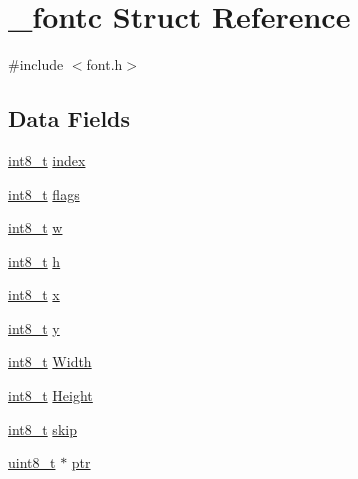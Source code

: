 \hypertarget{struct__fontc}{\section{\-\_\-fontc Struct Reference}
\label{struct__fontc}
}


{\ttfamily \#include $<$font.\-h$>$}

\subsection*{Data Fields}
\begin{DoxyCompactItemize}
\item 
\hyperlink{earth2wireframe_8c_aef44329758059c91c76d334e8fc09700}{int8\-\_\-t} \hyperlink{struct__fontc_a7cc0370744ff7ea964054d36917c9a2f}{index}
\item 
\hyperlink{earth2wireframe_8c_aef44329758059c91c76d334e8fc09700}{int8\-\_\-t} \hyperlink{struct__fontc_aa74d9a5513b529b5e444f283afea40ef}{flags}
\item 
\hyperlink{earth2wireframe_8c_aef44329758059c91c76d334e8fc09700}{int8\-\_\-t} \hyperlink{struct__fontc_a9c2af0354d2b2009e7b6684e25fd479b}{w}
\item 
\hyperlink{earth2wireframe_8c_aef44329758059c91c76d334e8fc09700}{int8\-\_\-t} \hyperlink{struct__fontc_a9feb8c838dfc1d4eebb15c8e53981944}{h}
\item 
\hyperlink{earth2wireframe_8c_aef44329758059c91c76d334e8fc09700}{int8\-\_\-t} \hyperlink{struct__fontc_ad15d00ed46ebe52a085cf05b5ca5da90}{x}
\item 
\hyperlink{earth2wireframe_8c_aef44329758059c91c76d334e8fc09700}{int8\-\_\-t} \hyperlink{struct__fontc_aebbde0dc41068722ee1a69f4a56478a4}{y}
\item 
\hyperlink{earth2wireframe_8c_aef44329758059c91c76d334e8fc09700}{int8\-\_\-t} \hyperlink{struct__fontc_ae3c802e1c35ae9a4e37c8eb2e9644325}{Width}
\item 
\hyperlink{earth2wireframe_8c_aef44329758059c91c76d334e8fc09700}{int8\-\_\-t} \hyperlink{struct__fontc_a98f97c237dfb1027c38813a17ef6dcd6}{Height}
\item 
\hyperlink{earth2wireframe_8c_aef44329758059c91c76d334e8fc09700}{int8\-\_\-t} \hyperlink{struct__fontc_a44c94e91afa006cb2ffe55a99b3e2d3c}{skip}
\item 
\hyperlink{send_8c_aba7bc1797add20fe3efdf37ced1182c5}{uint8\-\_\-t} $\ast$ \hyperlink{struct__fontc_a60a3fef5ccd80dff543aac3f22f74876}{ptr}
\end{DoxyCompactItemize}


